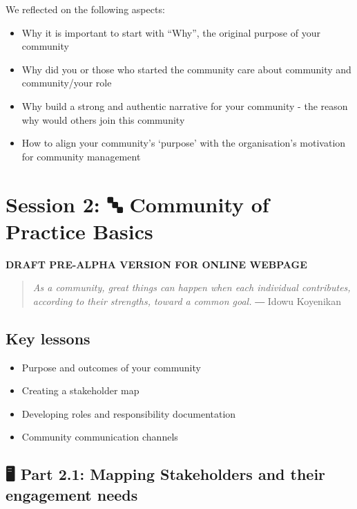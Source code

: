 \documentclass[
  letterpaper,
  DIV=11,
  numbers=noendperiod]{scrreport}
\providecommand{\tightlist}{%
  \setlength{\itemsep}{0pt}\setlength{\parskip}{0pt}}\usepackage{longtable,booktabs,array}
\begin{document}
We reflected on the following aspects:

\begin{itemize}
\tightlist
\item
  Why it is important to start with ``Why'', the original purpose of
  your community
\item
  Why did you or those who started the community care about community
  and community/your role
\item
  Why build a strong and authentic narrative for your community - the
  reason why would others join this community
\item
  How to align your community's `purpose' with the organisation's
  motivation for community management
\end{itemize}


\hypertarget{session-2-community-of-practice-basics}{%
\chapter{Session 2: 🔤 Community of Practice
Basics}\label{session-2-community-of-practice-basics}}

\textbf{DRAFT PRE-ALPHA VERSION FOR ONLINE WEBPAGE}

\begin{quote}
\emph{As a community, great things can happen when each individual
contributes, according to their strengths, toward a common goal.} ―
Idowu Koyenikan
\end{quote}

\hypertarget{key-lessons-1}{%
\section{Key lessons}\label{key-lessons-1}}

\begin{itemize}
\tightlist
\item
  Purpose and outcomes of your community
\item
  Creating a stakeholder map
\item
  Developing roles and responsibility documentation
\item
  Community communication channels
\end{itemize}

\hypertarget{part-2.1-mapping-stakeholders-and-their-engagement-needs}{%
\section{🖥 Part 2.1: Mapping Stakeholders and their engagement
needs}\label{part-2.1-mapping-stakeholders-and-their-engagement-needs}}
\end{document}
